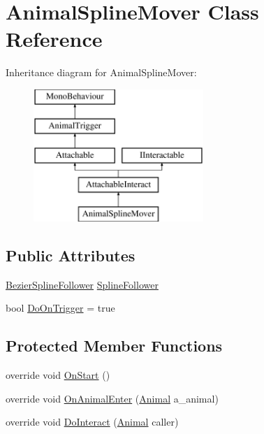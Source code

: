 \hypertarget{class_animal_spline_mover}{}\section{Animal\+Spline\+Mover Class Reference}
\label{class_animal_spline_mover}
Inheritance diagram for Animal\+Spline\+Mover\+:\begin{figure}[H]
\begin{center}
\leavevmode
\includegraphics[height=5.000000cm]{class_animal_spline_mover}
\end{center}
\end{figure}
\subsection*{Public Attributes}
\begin{DoxyCompactItemize}
\item 
\mbox{\hyperlink{class_bezier_spline_follower}{Bezier\+Spline\+Follower}} \mbox{\hyperlink{class_animal_spline_mover_a6e64d1f5f137838fe94ba81bba8e1503}{Spline\+Follower}}
\item 
bool \mbox{\hyperlink{class_animal_spline_mover_af06d16ca69b27f991b445299105164dd}{Do\+On\+Trigger}} = true
\end{DoxyCompactItemize}
\subsection*{Protected Member Functions}
\begin{DoxyCompactItemize}
\item 
override void \mbox{\hyperlink{class_animal_spline_mover_aa088e9d7a088c6b2125a5388d13b95a7}{On\+Start}} ()
\item 
override void \mbox{\hyperlink{class_animal_spline_mover_acadeba87020c2abcea749a5a522fff54}{On\+Animal\+Enter}} (\mbox{\hyperlink{class_animal}{Animal}} a\+\_\+animal)
\item 
override void \mbox{\hyperlink{class_animal_spline_mover_aa8555455eae08f3834a1cafb97a21c36}{Do\+Interact}} (\mbox{\hyperlink{class_animal}{Animal}} caller)
\end{DoxyCompactItemize}
